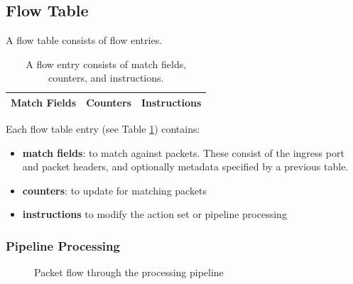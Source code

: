 \documentclass[10pt]{article}
\begin{document}
\subsection{Flow Table}
\label{ft:flowtableentry}

A flow table consists of flow entries.

\begin{table}[hbp]
\centering
\begin{tabular}{|c|c|c|}
\hline	
Match Fields & Counters & Instructions\\ 
\hline	
\end{tabular}
\caption{A flow entry consists of match fields, counters, and instructions.}
\label{table:flow entry}
\end{table}

Each flow table entry (see Table \ref{table:flow entry}) contains: 
\begin{itemize} 
\item \textbf{match fields}: to match against packets. These consist of the ingress port and packet headers, and optionally metadata specified by a previous table.
\item \textbf{counters}: to update for matching packets
\item \textbf{instructions} to modify the action set or pipeline processing
\end{itemize} 

\subsubsection{Pipeline Processing}
\label{sec:pipeline}

\begin{figure}[htbp]
\centering
{}
\caption{Packet flow through the processing pipeline}
\label{fig:packet flow multiple tables}
\end{figure}
\end{document}
